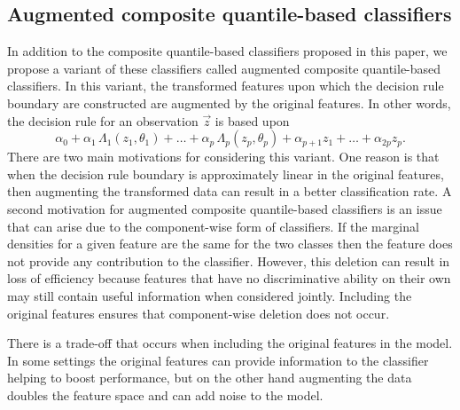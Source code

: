 \subsection{Augmented composite quantile-based classifiers}
\label{sec:augmented}

In addition to the composite quantile-based classifiers proposed in this paper,
we propose a variant of these classifiers called augmented composite
quantile-based classifiers.  In this variant, the transformed features upon
which the decision rule boundary are constructed are augmented by the original
features.  In other words, the decision rule for an observation $\vec{z}$ is
based upon
\begin{equation}
  \label{eq:augmented-rule}
  \alpha_0 +
  \alpha_1 \,\Lambda_1 (z_1, \theta_1) +
  \dots +
  \alpha_p \,\Lambda_p (z_p, \theta_p) +
  \alpha_{p + 1} z_1 +
  \dots +
  \alpha_{2p} z_p.
\end{equation}
There are two main motivations for considering this variant.  One reason is that
when the decision rule boundary is approximately linear in the original
features, then augmenting the transformed data can result in a better
classification rate.  A second motivation for augmented composite quantile-based
classifiers is an issue that can arise due to the component-wise form of
classifiers.  If the marginal densities for a given feature are the same for the
two classes then the feature does not provide any contribution to the
classifier.  However, this deletion can result in loss of efficiency because
features that have no discriminative ability on their own may still contain
useful information when considered jointly.  Including the original features
ensures that component-wise deletion does not occur.

There is a trade-off that occurs when including the original features
in the model.  In some settings the original features can provide information to
the classifier helping to boost performance, but on the other hand augmenting
the data doubles the feature space and can add noise to the model.




